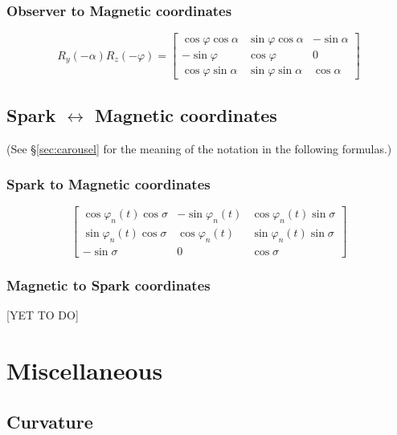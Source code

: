 \documentclass{article}
\newcommand{\phase}{\varphi}
\begin{document}
\subsubsection{Observer to Magnetic coordinates}
\begin{equation}
    R_y(-\alpha) R_z(-\phase) =
    \begin{bmatrix}
        \cos\phase\cos\alpha & \sin\phase\cos\alpha & -\sin\alpha \\
        -\sin\phase          & \cos\phase           & 0           \\
        \cos\phase\sin\alpha & \sin\phase\sin\alpha &  \cos\alpha
    \end{bmatrix}
\end{equation}

\subsection{Spark $\leftrightarrow$ Magnetic coordinates}

(See \S\ref{sec:carousel} for the meaning of the notation in the following formulas.)

\subsubsection{Spark to Magnetic coordinates}
\begin{equation}
    \begin{bmatrix}
        \cos\phase_n(t)\cos\sigma & -\sin\phase_n(t) & \cos\phase_n(t)\sin\sigma \\
        \sin\phase_n(t)\cos\sigma &  \cos\phase_n(t) & \sin\phase_n(t)\sin\sigma \\
        -\sin\sigma          & 0           & \cos\sigma
    \end{bmatrix}
\end{equation}

\subsubsection{Magnetic to Spark coordinates}

[YET TO DO]

\section{Miscellaneous}

\subsection{Curvature}
\end{document}
